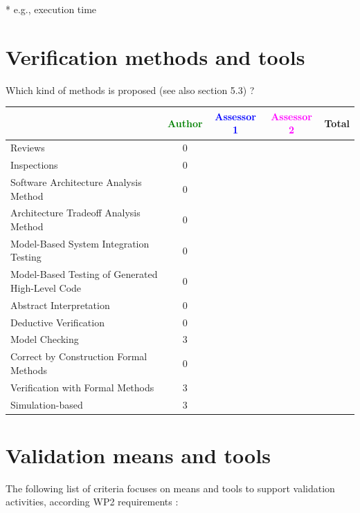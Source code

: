 \begin{author_comment}
	* e.g., execution time
\end{author_comment}


\section{Verification methods and tools}

Which kind of methods is proposed (see also \citep{D4.1} section 5.3) ?



\begin{tabular}{|l | c | c | c | c|}
\hline
& \textcolor{green}{Author} & \textcolor{blue}{Assessor 1} & \textcolor{magenta}{Assessor 2} & Total \\
\hline 
Reviews & 0 & & &  \\
\hline
Inspections & 0 & & &  \\
\hline
Software Architecture Analysis Method & 0 & & &  \\
\hline
Architecture Tradeoff Analysis Method & 0 & & &  \\
\hline
Model-Based System Integration Testing & 0 & & &  \\
\hline
Model-Based Testing of Generated High-Level Code & 0 & & &  \\
\hline
Abstract Interpretation & 0 & & &  \\
\hline
Deductive Verification & 0 & & &  \\
\hline
Model Checking & 3 & & &  \\
\hline
Correct by Construction Formal Methods & 0 & & &  \\
\hline
Verification with Formal Methods & 3 & & &  \\
\hline
Simulation-based & 3 & & &  \\
\hline
\end{tabular}

\section{Validation means and tools}

The following list of criteria focuses on means and tools to support validation activities, according WP2  requirements :

